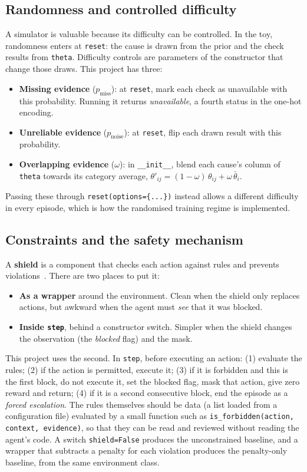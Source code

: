 \documentclass[11pt,a4paper]{article}
\begin{document}
\subsection{Randomness and controlled difficulty}
A simulator is valuable because its difficulty can be controlled. In the toy, randomness enters at \texttt{reset}: the cause is drawn from the prior and the check results from \texttt{theta}. Difficulty controls are parameters of the constructor that change those draws. This project has three:
\begin{itemize}
  \item \textbf{Missing evidence} ($p_{\text{miss}}$): at \texttt{reset}, mark each check as unavailable with this probability. Running it returns \emph{unavailable}, a fourth status in the one-hot encoding.
  \item \textbf{Unreliable evidence} ($p_{\text{noise}}$): at \texttt{reset}, flip each drawn result with this probability.
  \item \textbf{Overlapping evidence} ($\omega$): in \texttt{\_\_init\_\_}, blend each cause's column of \texttt{theta} towards its category average, $\theta'_{ij} = (1-\omega)\,\theta_{ij} + \omega\,\bar\theta_i$.
\end{itemize}
Passing these through \texttt{reset(options=\{...\})} instead allows a different difficulty in every episode, which is how the randomised training regime is implemented.

\subsection{Constraints and the safety mechanism}
\label{sec:shield}
A \textbf{shield} is a component that checks each action against rules and prevents violations~\cite{shield}. There are two places to put it:
\begin{itemize}
  \item \textbf{As a wrapper} around the environment. Clean when the shield only replaces actions, but awkward when the agent must \emph{see} that it was blocked.
  \item \textbf{Inside \texttt{step}}, behind a constructor switch. Simpler when the shield changes the observation (the \emph{blocked} flag) and the mask.
\end{itemize}
This project uses the second. In \texttt{step}, before executing an action: (1) evaluate the rules; (2) if the action is permitted, execute it; (3) if it is forbidden and this is the first block, do not execute it, set the blocked flag, mask that action, give zero reward and return; (4) if it is a second consecutive block, end the episode as a \emph{forced escalation}. The rules themselves should be data (a list loaded from a configuration file) evaluated by a small function such as \texttt{is\_forbidden(action, context, evidence)}, so that they can be read and reviewed without reading the agent's code. A switch \texttt{shield=False} produces the unconstrained baseline, and a wrapper that subtracts a penalty for each violation produces the penalty-only baseline, from the same environment class.
\end{document}
